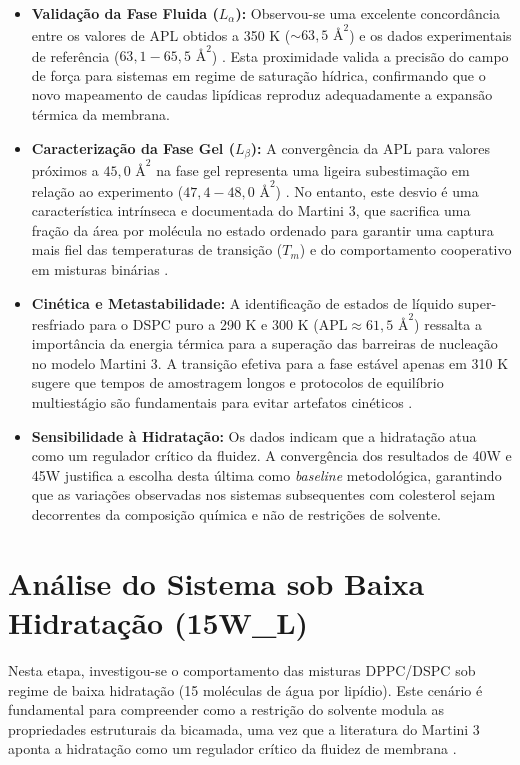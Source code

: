 \documentclass[12pt]{article} %
\begin{document}
\begin{itemize}
    \item \textbf{Validação da Fase Fluida ($L_\alpha$):} Observou-se uma excelente concordância entre os valores de APL obtidos a 350 K ($\sim 63,5 \text{ \AA}^2$) e os dados experimentais de referência ($63,1 - 65,5 \text{ \AA}^2$) \cite{pedersen2024}. Esta proximidade valida a precisão do campo de força para sistemas em regime de saturação hídrica, confirmando que o novo mapeamento de caudas lipídicas reproduz adequadamente a expansão térmica da membrana.
    
    \item \textbf{Caracterização da Fase Gel ($L_\beta$):} A convergência da APL para valores próximos a $45,0 \text{ \AA}^2$ na fase gel representa uma ligeira subestimação em relação ao experimento ($47,4 - 48,0 \text{ \AA}^2$) \cite{pedersen2024}. No entanto, este desvio é uma característica intrínseca e documentada do Martini 3, que sacrifica uma fração da área por molécula no estado ordenado para garantir uma captura mais fiel das temperaturas de transição ($T_m$) e do comportamento cooperativo em misturas binárias \cite{pedersen2024}.
    
    \item \textbf{Cinética e Metastabilidade:} A identificação de estados de líquido super-resfriado para o DSPC puro a 290 K e 300 K ($\text{APL} \approx 61,5 \text{ \AA}^2$) ressalta a importância da energia térmica para a superação das barreiras de nucleação no modelo Martini 3. A transição efetiva para a fase estável apenas em 310 K sugere que tempos de amostragem longos e protocolos de equilíbrio multiestágio são fundamentais para evitar artefatos cinéticos \cite{pedersen2024}.
    
    \item \textbf{Sensibilidade à Hidratação:} Os dados indicam que a hidratação atua como um regulador crítico da fluidez. A convergência dos resultados de 40W e 45W justifica a escolha desta última como \textit{baseline} metodológica, garantindo que as variações observadas nos sistemas subsequentes com colesterol sejam decorrentes da composição química e não de restrições de solvente.
\end{itemize}

\section{Análise do Sistema sob Baixa Hidratação (15W\_L)}

Nesta etapa, investigou-se o comportamento das misturas DPPC/DSPC sob regime de baixa hidratação (15 moléculas de água por lipídio). Este cenário é fundamental para compreender como a restrição do solvente modula as propriedades estruturais da bicamada, uma vez que a literatura do Martini 3 aponta a hidratação como um regulador crítico da fluidez de membrana \cite{pedersen2024}.
\end{document}
